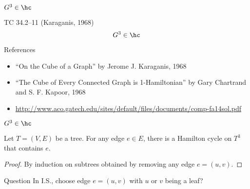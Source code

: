 \begin{frame}{$G^3 \in \hc$}
  \begin{exampleblock}{TC 34.2--11 (Karaganis, 1968)}
	\[
	  G^3 \in \hc
	\]
  \end{exampleblock}

  \begin{alertblock}{References}
	\begin{itemize}
	  \item ``On the Cube of a Graph'' by Jerome J. Karaganis, 1968
	  \item ``The Cube of Every Connected Graph is 1-Hamiltonian'' by Gary Chartrand and S. F. Kapoor, 1968
	  \item \url{http://www.aco.gatech.edu/sites/default/files/documents/comp-fa14sol.pdf}
	  \end{itemize}
  \end{alertblock}
\end{frame}

\begin{frame}{$G^3 \in \hc$}
  \begin{theorem}[$T^3 \in \hc$]
	Let $T = (V, E)$ be a tree. For any edge $e \in E$, there is a Hamilton cycle on $T^3$ that contains $e$.
  \end{theorem}

  \begin{proof}
	\centerline{By induction on subtrees obtained by removing any edge $e = (u,v)$.}
  \end{proof}

  \begin{alertblock}{Question}
	In I.S., choose edge $e = (u,v)$ with $u$ or $v$ being a leaf?
  \end{alertblock}
\end{frame}
